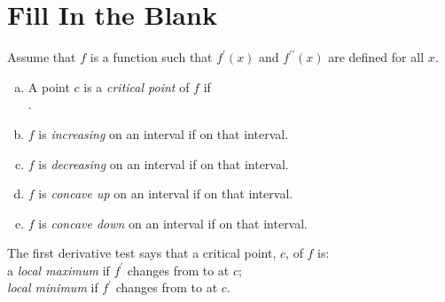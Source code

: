 \documentclass[12pt]{amsart}
\begin{document}
\section*{Fill In the Blank}
\begin{thm}[5 Points]
  Assume that $f$ is a function such that $f^\prime(x)$ and $f^{\prime\prime}(x)$ are defined for all $x$.
  \begin{enumerate}[(a)]
  \item
    A point \(c\) is a \textit{critical point} of \(f\) if \vspace{.15in}\\
    {\underline{\hspace{4in}}}.
    \vspace{.15in}
  \item
    $f$ is \textit{increasing} on an interval if {\underline{\hspace{1.5in}}} on that interval.
    \vspace{.15in}
  \item
    $f$ is \textit{decreasing} on an interval if {\underline{\hspace{1.5in}}} on that interval.
    \vspace{.15in}
  \item
    $f$ is \textit{concave up} on an interval if {\underline{\hspace{1.5in}}} on that interval.
    \vspace{.15in}
  \item
    $f$ is \textit{concave down} on an interval if {\underline{\hspace{1.5in}}} on that interval.
    \vspace{.15in}
  \end{enumerate}
\end{thm}

\begin{thm}[4 Points]
  The first derivative test says that a critical point, $c$, of $f$ is: \vspace{.15in}\\
  a \textit{local maximum} if $f^\prime$ changes from {\underline{\hspace{1.5in}}} to {\underline{\hspace{1.5in}}} at $c$;    \vspace{.15in}\\
  \textit{local minimum} if $f^\prime$ changes from {\underline{\hspace{1.5in}}} to {\underline{\hspace{1.5in}}} at $c$.
\end{thm}
\end{document}
